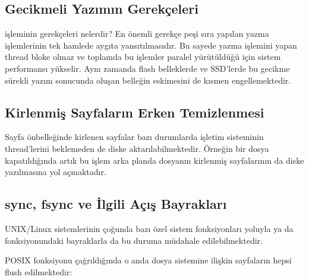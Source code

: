 \documentclass[a4paper,10pt,turkish]{sphinxmanual}
\begin{document}
\subsection{Gecikmeli Yazımın Gerekçeleri}
\label{\detokenize{filesystem1:gecikmeli-yazimin-gerekceleri}}
\sphinxAtStartPar
{} işleminin gerekçeleri nelerdir? En önemli gerekçe peşi sıra
yapılan yazma işlemlerinin tek hamlede aygıta yansıtılmasıdır. Bu sayede yazma işlemini yapan
thread bloke olmaz ve toplamda bu işlemler paralel yürütüldüğü için sistem performansı yükselir.
Aynı zamanda flash belleklerde ve SSD’lerde bu gecikme sürekli yazım sonucunda oluşan belleğin
eskimesini de kısmen engellemektedir.


\subsection{Kirlenmiş Sayfaların Erken Temizlenmesi}
\label{\detokenize{filesystem1:kirlenmis-sayfalarin-erken-temizlenmesi}}
\sphinxAtStartPar
Sayfa önbelleğinde kirlenen sayfalar bazı durumlarda işletim sisteminin 
thread’lerini beklemeden de diske aktarılabilmektedir. Örneğin bir dosya kapatıldığında artık
bu işlem arka planda dosyanın kirlenmiş sayfalarının da diske yazılmasına yol açmaktadır.


\subsection{sync, fsync ve İlgili Açış Bayrakları}
\label{\detokenize{filesystem1:sync-fsync-ve-ilgili-acis-bayraklari}}
\sphinxAtStartPar
UNIX/Linux sistemlerinin çoğunda bazı özel sistem fonksiyonları yoluyla ya da 
fonksiyonundaki bayraklarla da bu duruma müdahale edilebilmektedir.

\sphinxAtStartPar
{} POSIX fonksiyonu çağrıldığında o anda dosya sistemine ilişkin 
sayfaların hepsi flush edilmektedir:

\begin{sphinxVerbatim}[commandchars=\\\{\}]

\end{sphinxVerbatim}
\end{document}
